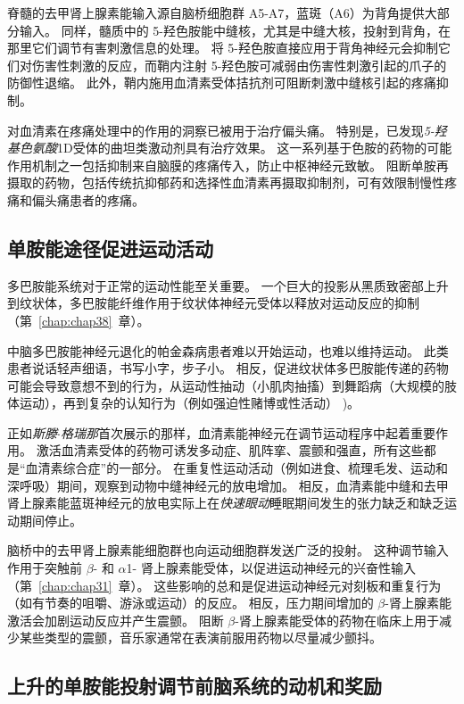脊髓的去甲肾上腺素能输入源自脑桥细胞群 A5-A7，蓝斑（A6）为背角提供大部分输入。
同样，髓质中的 5-羟色胺能中缝核，尤其是中缝大核，投射到背角，在那里它们调节有害刺激信息的处理。
将 5-羟色胺直接应用于背角神经元会抑制它们对伤害性刺激的反应，而鞘内注射 5-羟色胺可减弱由伤害性刺激引起的爪子的防御性退缩。
此外，鞘内施用血清素受体拮抗剂可阻断刺激中缝核引起的疼痛抑制。


对血清素在疼痛处理中的作用的洞察已被用于治疗偏头痛。
特别是，已发现\textit{5-羟基色氨酸}1D受体的曲坦类激动剂具有治疗效果。
这一系列基于色胺的药物的可能作用机制之一包括抑制来自脑膜的疼痛传入，防止中枢神经元致敏。
阻断单胺再摄取的药物，包括传统抗抑郁药和选择性血清素再摄取抑制剂，可有效限制慢性疼痛和偏头痛患者的疼痛。



\subsection{单胺能途径促进运动活动}

多巴胺能系统对于正常的运动性能至关重要。
一个巨大的投影从黑质致密部上升到纹状体，多巴胺能纤维作用于纹状体神经元受体以释放对运动反应的抑制（第~\ref{chap:chap38}~章）。


中脑多巴胺能神经元退化的帕金森病患者难以开始运动，也难以维持运动。
此类患者说话轻声细语，书写小字，步子小。
相反，促进纹状体多巴胺能传递的药物可能会导致意想不到的行为，从运动性抽动（小肌肉抽搐）到舞蹈病（大规模的肢体运动），再到复杂的认知行为（例如强迫性赌博或性活动） )。


正如\textit{斯滕$\cdot$格瑞那}首次展示的那样，血清素能神经元在调节运动程序中起着重要作用。
激活血清素受体的药物可诱发多动症、肌阵挛、震颤和强直，所有这些都是“血清素综合症”的一部分。
在重复性运动活动（例如进食、梳理毛发、运动和深呼吸）期间，观察到动物中缝神经元的放电增加。
相反，血清素能中缝和去甲肾上腺素能蓝斑神经元的放电实际上在\textit{快速眼动}睡眠期间发生的张力缺乏和缺乏运动期间停止。


脑桥中的去甲肾上腺素能细胞群也向运动细胞群发送广泛的投射。
这种调节输入作用于突触前 $\beta$- 和 $\alpha$1- 肾上腺素能受体，以促进运动神经元的兴奋性输入（第~\ref{chap:chap31}~章）。
这些影响的总和是促进运动神经元对刻板和重复行为（如有节奏的咀嚼、游泳或运动）的反应。
相反，压力期间增加的 $\beta$-肾上腺素能激活会加剧运动反应并产生震颤。
阻断 $\beta$-肾上腺素能受体的药物在临床上用于减少某些类型的震颤，音乐家通常在表演前服用药物以尽量减少颤抖。



\subsection{上升的单胺能投射调节前脑系统的动机和奖励}

